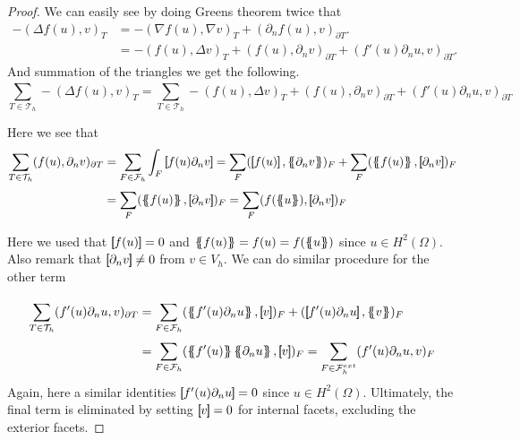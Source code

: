 \begin{proof}
  We can easily see by doing Greens theorem twice that \[
    \begin{split}
-(\Delta f( u) , v)_{T } &= -(\nabla f( u), \nabla v  )_{T } + ( \partial _{n}  f( u), v )_{\partial T }.\\
                    & = -( f( u), \Delta v )_{T} + (f( u), \partial _{n} v  )_{\partial T} + (   f'( u)\partial _{n}u, v )_{\partial T } .
    \end{split}
\]
 And summation of the triangles we get the following.
\[
\sum_{T \in  \mathcal{T} _{h} }^{} -(\Delta f( u) , v)_{T } = \sum_{T \in \mathcal{T} _{h}}^{}  -( f( u), \Delta v )_{T} + (f( u), \partial _{n} v  )_{\partial T} + (   f'( u)\partial _{n}u, v )_{\partial T }
\]

Here we see that \[
    \begin{split}
\sum_{T \in \mathcal{T}_{h} }^{} ( f( u) , \partial _{n}v)_{\partial T} & =  \sum_{F \in \mathcal{F}_{h} }^{} \int_{F}^{}  \jump{    f( u) \partial _{n}v}  = \sum_{F}^{} ( \jump{f( u)} , \mean{ \partial _{n}v }  )_{F} + \sum_{F}^{} ( \mean{f( u)}
, \jump{ \partial _{n}v }  )_{F} \\
 & =   \sum_{F}^{} ( \mean{f( u)} , \jump{ \partial _{n}v }  )_{F} = \sum_{F}^{} ( f(\mean{ u}) , \jump{ \partial _{n}v }  )_{F}
    \end{split}
\]

Here we used that $ \left[\!\!\left[  f( u)   \right]\!\!\right] = 0  $ and $\mean{ f( u)  } = f( u) = f( \mean{ u }  )    $  since $u \in H^2( \Omega ) $. Also remark that $\left[\!\!\left[  \partial _{n}v  \right]\!\!\right] \neq 0   $ from $v \in V_{h}$. We can do similar procedure for the other term

\[
    \begin{split}
\sum_{T \in \mathcal{T} _{h}}^{} (   f'( u)\partial _{n}u, v )_{\partial T } & = \sum_{F \in \mathcal{F} _{h}}^{} (\mean{ f'( u)\partial _{n}u }  , \jump{ v }   )_{F} +  (\jump{ f'( u)\partial _{n}u }  , \mean{ v }   )_{F} \\
                                                                             & = \sum_{F \in \mathcal{F} _{h}}^{} (\mean{ f'( u)} \mean{ \partial _{n}u }  , \jump{ v }   )_{F} = \sum_{F \in \mathcal{F} _{h}^{ext}}^{} ( f'( u)  \partial _{n}u   ,  v
                                                                             )_{F}  \\
    \end{split}
\]
Again, here a similar identities $\left[\!\!\left[   f' ( u) \partial _{n} u \right]\!\!\right] = 0  $ since $u \in H^2( \Omega ) $. Ultimately, the final term is eliminated by setting $ \left[\!\!\left[ v \right]\!\!\right] = 0 $ for internal facets, excluding the exterior facets.
\end{proof}


